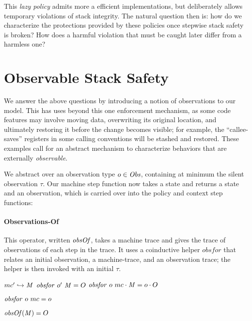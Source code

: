 \documentclass[10pt,conference]{ieeetran}%
\theoremstyle{definition}
\begin{document}
{This \emph{lazy policy} admits more a efficient implementations, but
deliberately allows temporary violations of stack integrity.
The natural question then is: how do we characterize the
protections provided by these policies once stepwise stack safety is broken?
How does a harmful violation that must be caught later differ from a
harmless one?

\section{Observable Stack Safety}
\label{sec:lazy}

We answer the above questions by introducing a notion of observations to our model.
This has uses beyond this one enforcement mechanism, as some code features may involve
moving data, overwriting its original location,
and ultimately restoring it before the change becomes visible; for example, the
``callee-saves'' registers in some calling conventions will be stashed and restored.
These examples call for an abstract mechanism to characterize behaviors that are externally
\emph{observable}.

We abstract over an
observation type \(o \in \mathit{Obs}\), containing at minimum the silent observation
\(\tau\). Our machine step function now takes a state and returns a state and an observation,
which is carried over into the policy and context step functions:

\paragraph*{Observations-Of}

This operator, written \(\mathit{obsOf}\), takes a machine trace and
gives the trace of observations of each step in
the trace. It uses a coinductive helper \(\mathit{obsfor}\) that relates an
initial observation, a machine-trace, and an observation trace; the helper is
then invoked with an initial \(\tau\).

                {\(mc' \hookrightarrow \mathit{M}\)}
                {\(\mathit{obsfor} ~ o' ~ \mathit{M} = O\)}
                {\(\mathit{obsfor} ~ o ~ mc \cdot \mathit{M} = o \cdot O\)}

\begin{minipage}[b]{.4\columnwidth}
  \judgment{}
           {\(\mathit{obsfor} ~ o ~ mc = o\)}
\end{minipage}
\begin{minipage}[b]{.4\columnwidth}
         {\(\mathit{obsOf}(\mathit{M}) = O\)}
\end{minipage}

}
\end{document}

